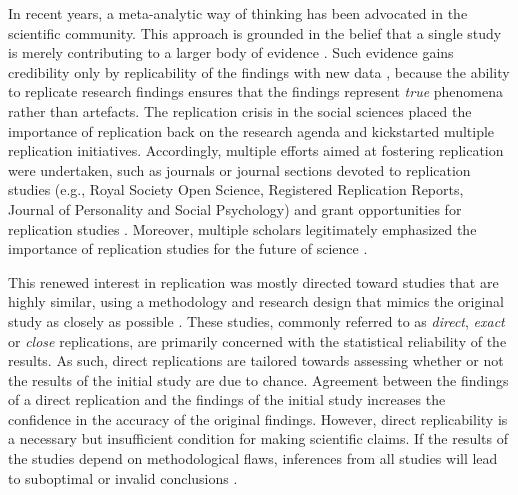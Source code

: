 \documentclass[review, 3p, authoryear]{elsarticle} %
\begin{document}
In recent years, a meta-analytic way of thinking has been advocated in the scientific community.
This approach is grounded in the belief that a single study is merely contributing to a larger body of evidence \citep[e.g.,][]{asendorpf_recommendations_2016, cumming_new_2014, goodman_reproducibility_2016}.
Such evidence gains credibility only by replicability of the findings with new data \citep{schmidt_replication_2009}, because the ability to replicate research findings ensures that the findings represent \emph{true} phenomena rather than artefacts.
The replication crisis in the social sciences placed the importance of replication back on the research agenda and kickstarted multiple replication initiatives.
Accordingly, multiple efforts aimed at fostering replication were undertaken, such as journals or journal sections devoted to replication studies (e.g., Royal Society Open Science, Registered Replication Reports, Journal of Personality and Social Psychology) and grant opportunities for replication studies \citep[e.g.,][]{nwo_replication_2020}.
Moreover, multiple scholars legitimately emphasized the importance of replication studies for the future of science \citep[e.g.,][]{baker_reproducibility_2016, brandt_et_al_replication_2014, munafo_manifesto_2017}.

This renewed interest in replication was mostly directed toward studies that are highly similar, using a methodology and research design that mimics the original study as closely as possible \citep[e.g.,][]{camerer2016evaluating, camerer2018evaluating, klein_etal_replicability_2014, nosek_replicability_review_2021, open_science_collab_2015}.
These studies, commonly referred to as \emph{direct}, \emph{exact} or \emph{close} replications, are primarily concerned with the statistical reliability of the results.
As such, direct replications are tailored towards assessing whether or not the results of the initial study are due to chance.
Agreement between the findings of a direct replication and the findings of the initial study increases the confidence in the accuracy of the original findings.
However, direct replicability is a necessary but insufficient condition for making scientific claims.
If the results of the studies depend on methodological flaws, inferences from all studies will lead to suboptimal or invalid conclusions \citep{lawlor_triangulation_2017, munafo_robust_2018}.
\end{document}
